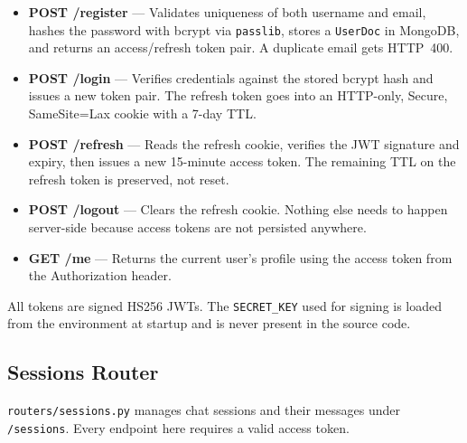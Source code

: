 \begin{itemize}
  \item \textbf{POST /register} --- Validates uniqueness of both username and email, hashes
        the password with bcrypt via \texttt{passlib}, stores a \texttt{UserDoc} in MongoDB,
        and returns an access/refresh token pair. A duplicate email gets HTTP~400.

  \item \textbf{POST /login} --- Verifies credentials against the stored bcrypt hash and
        issues a new token pair. The refresh token goes into an HTTP-only, Secure,
        SameSite=Lax cookie with a 7-day TTL.

  \item \textbf{POST /refresh} --- Reads the refresh cookie, verifies the JWT signature and
        expiry, then issues a new 15-minute access token. The remaining TTL on the refresh
        token is preserved, not reset.

  \item \textbf{POST /logout} --- Clears the refresh cookie. Nothing else needs to happen
        server-side because access tokens are not persisted anywhere.

  \item \textbf{GET /me} --- Returns the current user's profile using the access token from
        the Authorization header.
\end{itemize}

All tokens are signed HS256 JWTs. The \texttt{SECRET\_KEY} used for signing is loaded
from the environment at startup and is never present in the source code.

\subsection{Sessions Router}
\label{sec:sessions-router}

\texttt{routers/sessions.py} manages chat sessions and their messages under
\texttt{/sessions}. Every endpoint here requires a valid access token.


